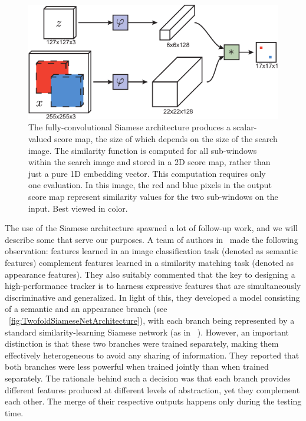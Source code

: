 \begin{figure}[t]
    \centerline{\includegraphics[width=0.6\linewidth]{figures/theoretical_foundations/fully_cnn_siam_tracking_architecture.pdf}}
    \caption[ architecture]{The fully-convolutional Siamese architecture produces a scalar-valued score map, the size of which depends on the size of the search image. The similarity function is computed for all sub-windows within the search image and stored in a 2D score map, rather than just a pure 1D embedding vector. This computation requires only one evaluation. In this image, the red and blue pixels in the output score map represent similarity values for the two sub-windows on the input. Best viewed in color. }
    \label{fig:FullyCNNSiamTrackingArch}
\end{figure}

The use of the Siamese architecture spawned a lot of follow-up work, and we will describe some that serve our purposes. A team of authors in~\cite{he2018twofoldsiam} made the following observation: features learned in an image classification task (denoted as semantic features) complement features learned in a similarity matching task (denoted as appearance features). They also suitably commented that the key to designing a high-performance tracker is to harness expressive features that are simultaneously discriminative and generalized. In light of this, they developed a model consisting of a semantic and an appearance branch (see \figstr{}~\ref{fig:TwofoldSiameseNetArchitecture}), with each branch being represented by a standard similarity-learning Siamese network (as in ~\cite{bertinetto2016siamfc}). However, an important distinction is that these two branches were trained separately, making them effectively heterogeneous to avoid any sharing of information. They reported that both branches were less powerful when trained jointly than when trained separately. The rationale behind such a decision was that each branch provides different features produced at different levels of abstraction, yet they complement each other. The merge of their respective outputs happens only during the testing time.

